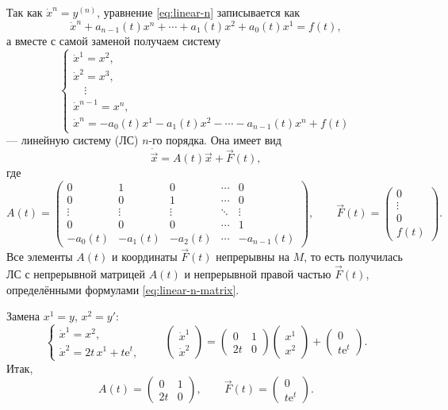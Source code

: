 \documentclass[12pt,a4paper]{article}
\numberwithin{equation}{section}
\newcommand{\vect}[1]{\vec{#1}}
\newcommand{\e}{\mathrm{e}}
\begin{document}
Так как \(\dot x^n=y^{(n)}\), уравнение \eqref{eq:linear-n} записывается как
\[
\dot x^n+a_{n-1}(t)x^n+\cdots+a_1(t)x^2+a_0(t)x^1=f(t),
\]
а вместе с самой заменой получаем систему
\begin{equation}
\begin{cases}
\dot x^1=x^2,\\
\dot x^2=x^3,\\
\quad\vdots\\
\dot x^{n-1}=x^n,\\
\dot x^n=-a_0(t)x^1-a_1(t)x^2-\cdots-a_{n-1}(t)x^n+f(t)
\end{cases}
\label{eq:linear-n-system}
\end{equation}
--- линейную систему (ЛС) \(n\)-го порядка. Она имеет вид
\[
\dot{\vect{x}}=A(t)\vect{x}+\vect{F}(t),
\]
где
\begin{equation}
A(t)=
\begin{pmatrix}
0&1&0&\cdots&0\\
0&0&1&\cdots&0\\
\vdots&\vdots&\vdots&\ddots&\vdots\\
0&0&0&\cdots&1\\
-a_0(t)&-a_1(t)&-a_2(t)&\cdots&-a_{n-1}(t)
\end{pmatrix},
\qquad
\vect{F}(t)=
\begin{pmatrix}0\\\vdots\\0\\f(t)\end{pmatrix}.
\label{eq:linear-n-matrix}
\end{equation}
Все элементы \(A(t)\) и координаты \(\vect{F}(t)\) непрерывны на \(M\), то есть получилась ЛС с непрерывной матрицей \(A(t)\) и непрерывной правой частью \(\vect{F}(t)\), определёнными формулами \eqref{eq:linear-n-matrix}.

\begin{exampleHSE}[\(y''-2ty=t\e^{t}\)]
Замена \(x^1=y\), \(x^2=y'\):
\[
\begin{cases}
\dot x^1=x^2,\\
\dot x^2=2t\,x^1+t\e^{t},
\end{cases}
\qquad
\begin{pmatrix}\dot x^1\\\dot x^2\end{pmatrix}
=
\begin{pmatrix}0&1\\2t&0\end{pmatrix}
\begin{pmatrix}x^1\\x^2\end{pmatrix}
+
\begin{pmatrix}0\\t\e^{t}\end{pmatrix}.
\]
Итак,
\[
A(t)=\begin{pmatrix}0&1\\2t&0\end{pmatrix},\qquad
\vect{F}(t)=\begin{pmatrix}0\\t\e^{t}\end{pmatrix}.
\]
\end{exampleHSE}
\end{document}
